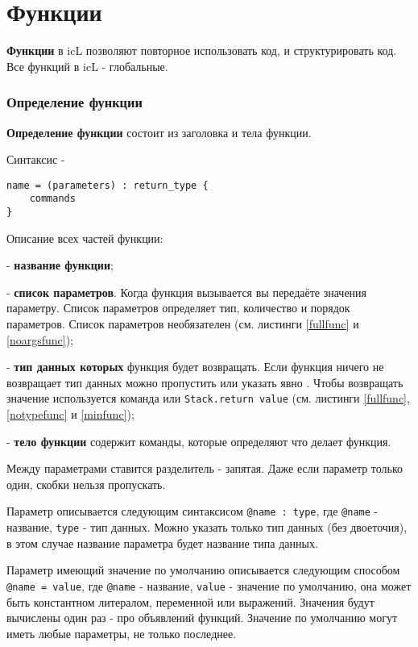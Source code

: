 \section{Функции}

{\bf Функции} в icL позволяют повторное использовать код, и структурировать код. Все функций в icL - глобальные.

\subsubsection{Определение функции}

{\bf Определение функции} состоит из заголовка и тела функции.

\noindent Синтаксис -
\begin{lstlisting}[numbers=none]
name = (parameters) : return_type {
	commands
}
\end{lstlisting}

Описание всех частей функции:
\begin{icItems}
\item
	 - {\bf название функции};
\item
	 - {\bf список параметров}. Когда функция вызывается вы передаёте значения параметру. Список параметров определяет тип, количество и порядок параметров. Список параметров необязателен (см. листинги \ref{fullfunc} и \ref{noargsfunc});
\item
	 - {\bf тип данных которых} функция будет возвращать. Если функция ничего не возвращает тип данных можно пропустить или указать явно \void{}. Чтобы возвращать значение используется команда  или \lstinline|Stack.return value| (см. листинги \ref{fullfunc}, \ref{notypefunc} и \ref{minfunc});
\item
	 - {\bf тело функции} содержит команды, которые определяют что делает функция.
\end{icItems}

Между параметрами ставится разделитель - запятая. Даже если параметр только один, скобки нельзя пропускать.

Параметр описывается следующим синтаксисом \lstinline|@name : type|, где \lstinline|@name| - название, \lstinline|type| - тип данных. Можно указать только тип данных (без двоеточия), в этом случае название параметра будет название типа данных.

Параметр имеющий значение по умолчанию описывается следующим способом \lstinline|@name = value|, где \lstinline|@name| - название, \lstinline|value| - значение по умолчанию, она может быть константном литералом, переменной или выражений. Значения будут вычислены один раз - про объявлений функций. Значение по умолчанию могут иметь любые параметры, не только последнее.

